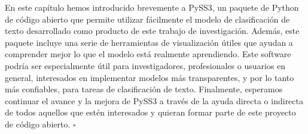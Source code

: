 En este capítulo hemos introducido brevemente a PySS3, un paquete de Python de código abierto que permite utilizar fácilmente el modelo de clasificación de texto desarrollado como producto de este trabajo de investigación. Además, este paquete incluye una serie de herramientas de visualización útiles que ayudan a comprender mejor lo que el modelo está realmente aprendiendo.
Este software podría ser especialmente útil para investigadores, profesionales o usuarios en general, interesados en implementar modelos más transparentes, y por lo tanto más confiables, para tareas de clasificación de texto.
Finalmente, esperamos continuar el avance y la mejora de PySS3 a través de la ayuda directa o indirecta de todos aquellos que estén interesados y quieran formar parte de este proyecto de código abierto.
\hfill$\square$